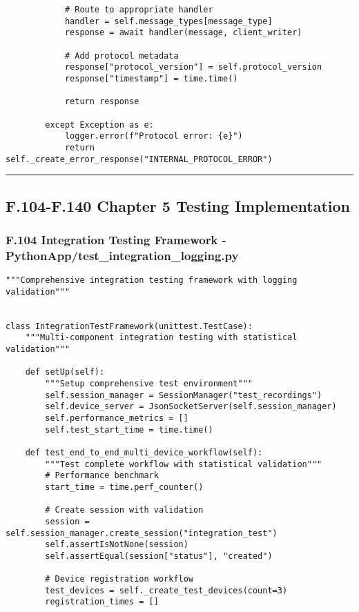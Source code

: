 \documentclass[11pt,a4paper]{report}
\begin{document}
{{\begin{verbatim}
            # Route to appropriate handler
            handler = self.message_types[message_type]
            response = await handler(message, client_writer)

            # Add protocol metadata
            response["protocol_version"] = self.protocol_version
            response["timestamp"] = time.time()

            return response

        except Exception as e:
            logger.error(f"Protocol error: {e}")
            return self._create_error_response("INTERNAL_PROTOCOL_ERROR")
\end{verbatim}

\hrule

\subsection{F.104-F.140 Chapter 5 Testing Implementation}

\subsubsection{F.104 Integration Testing Framework - PythonApp/test_integration_logging.py}

\begin{verbatim}
"""Comprehensive integration testing framework with logging validation"""


class IntegrationTestFramework(unittest.TestCase):
    """Multi-component integration testing with statistical validation"""

    def setUp(self):
        """Setup comprehensive test environment"""
        self.session_manager = SessionManager("test_recordings")
        self.device_server = JsonSocketServer(self.session_manager)
        self.performance_metrics = []
        self.test_start_time = time.time()

    def test_end_to_end_multi_device_workflow(self):
        """Test complete workflow with statistical validation"""
        # Performance benchmark
        start_time = time.perf_counter()

        # Create session with validation
        session = self.session_manager.create_session("integration_test")
        self.assertIsNotNone(session)
        self.assertEqual(session["status"], "created")

        # Device registration workflow
        test_devices = self._create_test_devices(count=3)
        registration_times = []


\end{verbatim}}}
\end{document}
